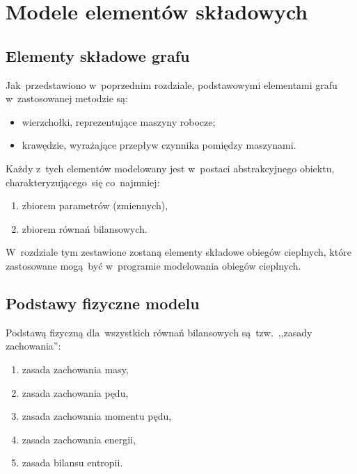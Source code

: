 \section{Modele elementów składowych}

\subsection{Elementy składowe grafu}

Jak~przedstawiono w~poprzednim rozdziale, podstawowymi elementami grafu
w~zastosowanej metodzie są:

\begin{itemize}

	\item wierzchołki, reprezentujące maszyny robocze;

	\item krawędzie, wyrażające przepływ czynnika pomiędzy maszynami.

\end{itemize}

Każdy z~tych elementów modelowany jest w~postaci abstrakcyjnego obiektu,
charakteryzującego~się co~najmniej:

\begin{enumerate}

	\item zbiorem parametrów (zmiennych),

	\item zbiorem równań bilansowych.

\end{enumerate}

W~rozdziale tym zestawione zostaną elementy składowe obiegów cieplnych,
które zastosowane mogą~być w~programie modelowania obiegów cieplnych.


\subsection{Podstawy fizyczne modelu}

Podstawą fizyczną dla~wszystkich równań bilansowych są~tzw.~,,zasady
zachowania'':

\begin{enumerate}

	\item zasada zachowania masy,

	\item zasada zachowania pędu,

	\item zasada zachowania momentu pędu,

	\item zasada zachowania energii,

	\item zasada bilansu entropii.

\end{enumerate}

